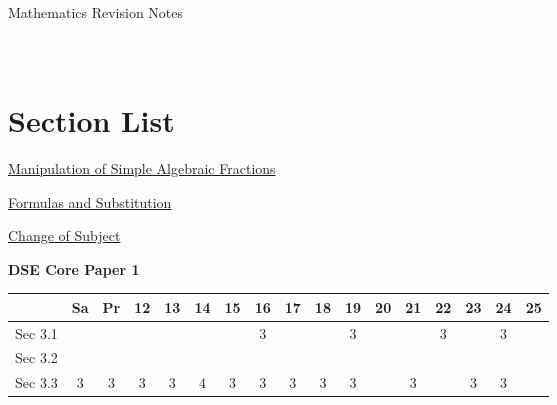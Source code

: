 \documentclass[12pt, a4paper]{article}
\begin{document}
\newpage
\newpage
\thispagestyle{empty}
\begin{center}
Mathematics Revision Notes\\\vspace{1cm}
\\\vspace{1cm}
{\fontsize{24pt}{24pt}\selectfont {Algebraic Fractions and Formulas}} \\\vspace{1cm}
\label{chapter:S2-3}

\end{center}
\vspace{0.5cm}
\hline
\section*{Section List}
\begin{enumx}[label=Sec 3.\arabic*\ ]
\item \hyperref[section:2-3-1]{Manipulation of Simple Algebraic Fractions}
\item \hyperref[section:2-3-2]{Formulas and Substitution}
\item \hyperref[section:2-3-3]{Change of Subject}
\end{enumx}
\begin{absolutelynopagebreak}
\begin{center}
\textbf{DSE Core Paper 1}
\end{center}
\begin{center}
\begin{tabular}{|l|c|c|c|c|c|c|c|c|c|c|c|c|c|c|c|c|}
\hline
        & Sa & Pr & 12 & 13 & 14 & 15 & 16 & 17 & 18 & 19 & 20 & 21 & 22 & 23 & 24 & 25 \\\hline\hline
Sec 3.1 &  &  &  &  &  &  &  $3$ &  &  &  $3$ &  &  &  $3$ &  &  $3$ &  \\\hline
Sec 3.2 &  &  &  &  &  &  &  &  &  &  &  &  &  &  &  &  \\\hline
Sec 3.3 &  $3$ &  $3$ &  $3$ &  $3$ &  $4$ &  $3$ &  $3$ &  $3$ &  $3$ &  $3$ &  &  $3$ &  &  $3$ &  $3$ &  \\\hline
\end{tabular}
\end{center}
\end{absolutelynopagebreak}
\end{document}
